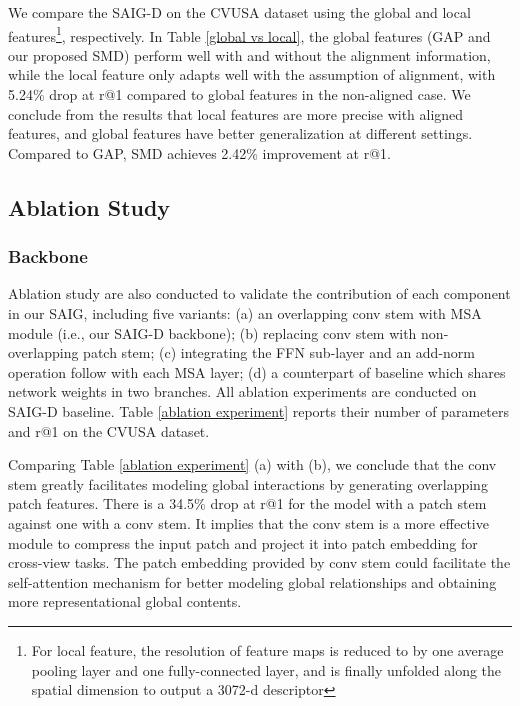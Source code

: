 \documentclass[sn-basic,iicol]{sn-jnl}
\theoremstyle{thmstyletwo}\newtheorem{example}{Example}\newtheorem{remark}{Remark}
\theoremstyle{thmstylethree}\newtheorem{definition}{Definition}
\begin{document}
 We compare the SAIG-D on the CVUSA dataset using the global and local features\footnote{For local feature, the resolution of feature maps is reduced to  by one average pooling layer and one fully-connected layer, and is finally unfolded along the spatial dimension to output a 3072-d descriptor}, respectively. In Table \ref{global vs local}, the global features (GAP and our proposed SMD) perform well with and without the alignment information, while the local feature only adapts well with the assumption of alignment, with 5.24\% drop at r@1 compared to global features in the non-aligned case. We conclude from the results that local features are more precise with aligned features, and global features have better generalization at different settings. Compared to GAP, SMD achieves 2.42\% improvement at r@1.






\subsection{Ablation Study}





\subsubsection{Backbone} Ablation study are also conducted to validate the contribution of each component in our SAIG, including five variants: (a) an overlapping conv stem with MSA module (i.e., our SAIG-D backbone); (b) replacing conv stem with non-overlapping patch stem; (c) integrating the FFN sub-layer and an add-norm operation follow with each MSA layer; (d) a counterpart of baseline which shares network weights in two branches. 
All ablation experiments are conducted on SAIG-D baseline. Table \ref{ablation experiment} reports their number of parameters and r@1 on the CVUSA dataset.

 Comparing Table \ref{ablation experiment} (a) with (b), we conclude that the conv stem greatly facilitates modeling global interactions by generating overlapping patch features. There is a 34.5\% drop at r@1 for the model with a patch stem against one with a conv stem. It implies that the conv stem is a more effective module to compress the input patch and project it into patch embedding for cross-view tasks. The patch embedding provided by conv stem could facilitate the self-attention mechanism for better modeling global relationships and obtaining more representational global contents. 
\end{document}

